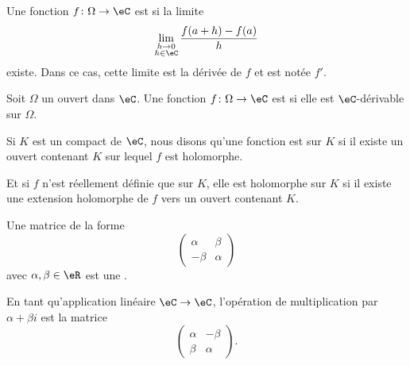 \begin{definition}      \label{DEFooVJVXooKlnFkh}
    Une fonction \( f\colon \Omega\to \eC\) est  si la limite
    \begin{equation}
        \lim_{\substack{h\to0\\h\in \eC}} \frac{ f(a+h)-f(a) }{ h }
    \end{equation}
    existe. Dans ce cas, cette limite est la dérivée de \( f\) et est notée \( f'\).
\end{definition}

\begin{definition}  \label{DefMMpjJZ}
    Soit \( \Omega\) un ouvert dans \( \eC\). Une fonction \( f\colon \Omega\to \eC\) est  si elle est \( \eC\)-dérivable sur \( \Omega\).
\end{definition}

\begin{definition}      \label{DEFooQSMCooOoWVZk}
    Si \( K\) est un compact de \( \eC\), nous disons qu'une fonction est  sur \( K\) si il existe un ouvert contenant \( K\) sur lequel \( f\) est holomorphe.

    Et si \( f\) n'est réellement définie que sur \( K\), elle est holomorphe sur \( K\) si il existe une extension holomorphe de \( f\) vers un ouvert contenant \( K\).
\end{definition}

\begin{definition}
    Une matrice de la forme
    \begin{equation}
        \begin{pmatrix}
            \alpha    &   \beta    \\
            -\beta    &   \alpha
        \end{pmatrix}
    \end{equation}
    avec \( \alpha,\beta\in \eR\) est une .
\end{definition}

\begin{lemma}       \label{LEMooJNFEooZCbJMo}
    En tant qu'application linéaire \( \eC\to \eC\), l'opération de multiplication par \( \alpha+\beta i\) est la matrice
    \begin{equation}
        \begin{pmatrix}
            \alpha    &   -\beta    \\
            \beta    &   \alpha
        \end{pmatrix}.
    \end{equation}
\end{lemma}


